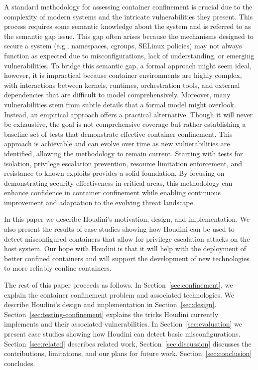A standard methodology for assessing container confinement is crucial due to the complexity of modern systems and the intricate vulnerabilities they present. This process requires some semantic knowledge about the system and is referred to as the semantic gap issue. This gap often arises because the mechanisms designed to secure a system (e.g., namespaces, cgroups, SELinux policies) may not always function as expected due to misconfigurations, lack of understanding, or emerging vulnerabilities. To bridge this semantic gap, a formal approach might seem ideal, however, it is impractical because container environments are highly complex, with interactions between kernels, runtimes, orchestration tools, and external dependencies that are difficult to model comprehensively. Moreover, many vulnerabilities stem from subtle details that a formal model might overlook. Instead, an empirical approach offers a practical alternative. Though it will never be exhaustive, the goal is not comprehensive coverage but rather establishing a baseline set of tests that demonstrate effective container confinement. This approach is achievable and can evolve over time as new vulnerabilities are identified, allowing the methodology to remain current. Starting with tests for isolation, privilege escalation prevention, resource limitation enforcement, and resistance to known exploits provides a solid foundation. By focusing on demonstrating security effectiveness in critical areas, this methodology can enhance confidence in container confinement while enabling continuous improvement and adaptation to the evolving threat landscape.

In this paper we describe Houdini's motivation, design, and implementation. We also present the results of case studies showing how Houdini can be used to detect misconfigured containers that allow for privilege escalation attacks on the host system. Our hope with Houdini is that it will help with the deployment of better confined containers and will support the development of new technologies to more reliably confine containers.

The rest of this paper proceeds as follows. In Section~\ref{sec:confinement}, we explain the container confinement problem and associated technologies.  We describe Houdini's design and implementation in Section~\ref{sec:design}. Section~\ref{sec:testing-confinement} explains the tricks Houdini currently implements and their associated vulnerabilities.  In Section~\ref{sec:evaluation} we present case studies showing how Houdini can detect basic misconfigurations.  Section~\ref{sec:related} describes related work, Section~\ref{sec:discussion} discusses the contributions, limitations, and our plans for future work.  Section~\ref{sec:conclusion} concludes.



